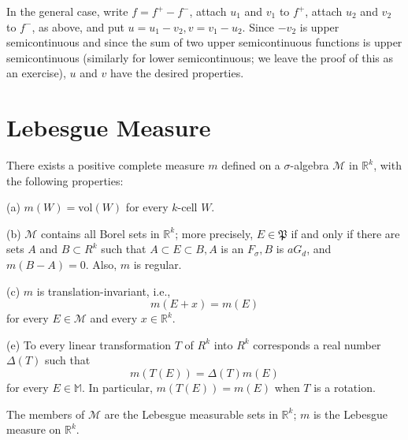\documentclass[12pt, a4paper, oneside]{book}
\begin{document}
\begin{theorem}
    In the general case, write $f=f^{+}-f^{-}$, attach $u_{1}$ and $v_{1}$ to $f^{+}$, attach $u_{2}$ and $v_{2}$ to $f^{-}$, as above, and put $u=u_{1}-v_{2}, v=v_{1}-u_{2}$. Since $-v_{2}$ is upper semicontinuous and since the sum of two upper semicontinuous functions is upper semicontinuous (similarly for lower semicontinuous; we leave the proof of this as an exercise), $u$ and $v$ have the desired properties.
\end{theorem}

\section{Lebesgue Measure}
\begin{theorem}
    There exists a positive complete measure $m$ defined on a $\sigma$-algebra $\mathcal{M}$ in $\mathbb{R}^{k}$, with the following properties:

    (a) $m(W)=\mathrm{vol}(W)$ for every $k$-cell $W$.

    (b) $\mathcal{M}$ contains all Borel sets in $\mathbb{R}^{k}$; more precisely, $E \in \mathfrak{P}$ if and only if there are sets $A$ and $B \subset R^{k}$ such that $A \subset E \subset B, A$ is an $F_{\sigma}, B$ is $a G_{d}$, and $m(B-A)=0$. Also, $m$ is regular.

    (c) $m$ is translation-invariant, i.e.,
    $$
        m(E+x)=m(E)
    $$
    for every $E \in \mathcal{M}$ and every $x \in \mathbb{R}^{k}$.



    (e) To every linear transformation $T$ of $R^{k}$ into $R^{k}$ corresponds a real number $\Delta(T)$ such that
    $$m(T(E))=\Delta(T) m(E)$$
    for every $E \in \mathbb{M}$. In particular, $m(T(E))=m(E)$ when $T$ is a rotation.

    The members of $\mathcal{M}$ are the Lebesgue measurable sets in $\mathbb{R}^{k}$; $m$ is the Lebesgue measure on $\mathbb{R}^{k}$.


\end{theorem}
\end{document}
